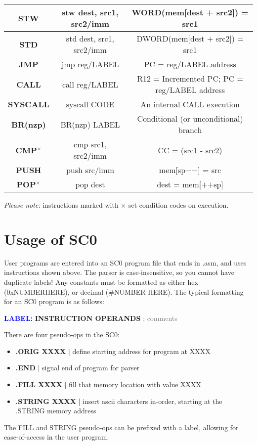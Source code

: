 \documentclass{article}
\newcommand*\scc[1]{{#1}\textbf{$^\times$}}
\begin{document}
\begin{tableofcontents}
\begin{center}
\begin{tabular}{|c|c|c|}
\hline
\textbf{STW} & stw dest, src1, src2/imm & WORD(mem[dest + src2]) = src1 \\
\hline
\textbf{STD} & std dest, src1, src2/imm & DWORD(mem[dest + src2]) = src1 \\
\hline
\textbf{JMP} & jmp reg/LABEL & PC = reg/LABEL address \\
\hline
\textbf{CALL} & call reg/LABEL & R12 = Incremented PC; PC = reg/LABEL address \\
\hline
\textbf{SYSCALL} & syscall CODE & An internal CALL execution \\
\hline
\textbf{BR(nzp)} & BR(nzp) LABEL & Conditional (or unconditional) branch \\
\hline
\textbf{\scc{CMP}} & cmp src1, src2/imm & CC = (src1 - src2) \\
\hline
\textbf{PUSH} & push src/imm & mem[sp$-$$-$] = src \\
\hline
\textbf{\scc{POP}} & pop dest & dest = mem[$+$$+$sp] \\
\hline
\end{tabular}
\end{center}
\textit{\Large Please note:} instructions marked with $\times$ set condition codes on execution.
\section{\Huge Usage of SC0}
\begin{Large}
User programs are entered into an SC0 program file that ends in .asm, 
and uses instructions shown above. The parser is case-insensitive,
so you cannot have duplicate labels! Any constants must be formatted
as either hex (0xNUMBERHERE), or decimal (\#NUMBER HERE).
The typical formatting for an SC0 program is as follows:
\begin{center}
\textcolor{blue}{\textbf{LABEL:}} \textbf{INSTRUCTION OPERANDS} \textcolor{gray}{; comments}
\end{center}
There are four pseudo-ops in the SC0:
\begin{itemize}
    \item \textbf{.ORIG XXXX} | define starting address for program at XXXX
    \item \textbf{.END} | signal end of program for parser
    \item \textbf{.FILL XXXX} | fill that memory location with value XXXX
    \item \textbf{.STRING XXXX} | insert ascii characters in-order, starting at the .STRING memory address
\end{itemize}
The FILL and STRING pseudo-ops can be prefixed with a label, allowing for ease-of-access
in the user program.


\end{Large}
\end{tableofcontents}
\end{document}
